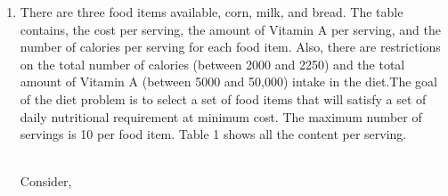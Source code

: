 \documentclass[journal,12pt,twocolumn]{IEEEtran}
\begin{document}
\begin{enumerate}
\item There are three food items available, corn, milk, and bread. The table contains,
the cost per serving, the amount of Vitamin A per serving, and the number of
calories per serving for each food item. Also, there are restrictions on the total
number of calories (between 2000 and 2250) and the total amount of Vitamin A
(between 5000 and 50,000) intake in the diet.The goal of the diet problem is to
select a set of food items that will satisfy a set of daily nutritional requirement
at minimum cost. The maximum number of servings is 10 per food item. Table 1 shows all the content per serving.\\
\begin{table}[H]
 \centering
 \caption{}
 \end{table}
\solution\\ 
Consider,\\
\begin{table}[H]
 \centering
 \caption{}
 \end{table}

\end{enumerate}
\end{document}

